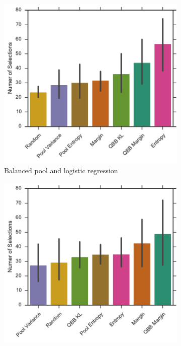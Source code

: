 \begin{figure}[p]
	\centering
	\begin{subfigure}{.5\textwidth}
		\centering
		\includegraphics[width=\textwidth]{figures/5_thompson/vstatlas_bl_no_selections}
		\caption{Balanced pool and logistic regression}
		\label{fig:vstatlas_bl_no_selections}
	\end{subfigure}%
	\begin{subfigure}{.5\textwidth}
		\centering
		\includegraphics[width=\linewidth]{figures/5_thompson/vstatlas_br_no_selections}

\end{subfigure}
\end{figure}
